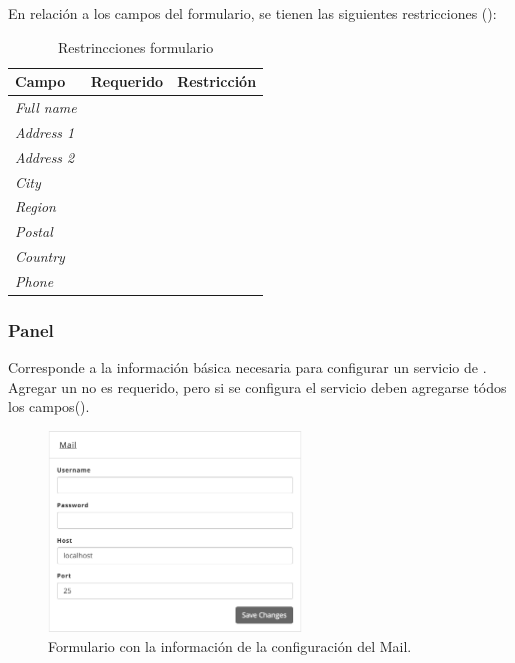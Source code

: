 En relación a los campos del formulario, se tienen las siguientes restricciones ():

\begin{table}[H]
    \centering
	\begin{tabular}{ |l|c||l| }
		\hline Campo & Requerido & Restricción \\ \hline
		\multirow{1}{*}{\textit{Full name}} &  {\checkmark} &  \\ \hline
		\multirow{1}{*}{\textit{Address 1}} &  {\checkmark} &  \\ \hline
		\multirow{1}{*}{\textit{Address 2}} &   			&  \\ \hline
		\multirow{1}{*}{\textit{City}} 		&  {\checkmark} &  \\ \hline
		\multirow{1}{*}{\textit{Region}} 	&  {\checkmark} &  \\ \hline
		\multirow{1}{*}{\textit{Postal}} 	&  {\checkmark} &  \\ \hline
		\multirow{1}{*}{\textit{Country}}	&  {\checkmark} &  \\ \hline
		\multirow{1}{*}{\textit{Phone}} 	&  {\checkmark} &  \\ \hline
	\end{tabular}
 	\caption{Restrincciones formulario \addressPanel}
    \label{tab:dashboard:ecommerce:form:address}
\end{table}


\subsubsection*{Panel \mailPanel}

Corresponde a la información básica necesaria para configurar un servicio de \email. Agregar un \email no es requerido, pero si se configura el servicio deben agregarse tódos los campos().

\begin{figure}[H]
	\centering
	\includegraphics[width=0.6\textwidth]{figuras/dashboard/ecommerce/mail/menu.png}
	\caption{Formulario con la información de la configuración del Mail.}
	\label{figure:dashboard:ecommerce:mail:menu}
\end{figure}

